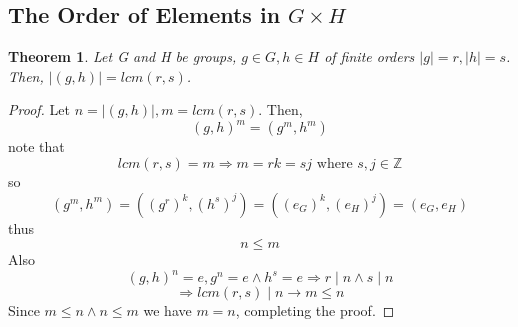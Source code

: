 \documentclass[12pt]{article}
\newtheorem{theorem}{Theorem}
\begin{document}
\subsection*{The Order of Elements in \(G \times H\)}
\begin{theorem}
    Let G and H be groups, \(g \in G, h \in H\) of finite orders \(|g| = r, |h| = s\). 
    Then, \(|(g,h)| = lcm(r,s)\).
\end{theorem}
\begin{proof}
    Let \(n = |(g, h)|, m = lcm(r,s)\). 
    Then, 
    \[ 
        (g,h)^m = (g^m, h^m)
    \]
    note that 
    \[ 
        lcm(r,s) = m \Rightarrow m = rk = sj \text{ where } s,j \in \mathbb Z 
    \]
    so 
    \[ 
        (g^m, h^m) = ((g^r)^k, (h^s)^j) = ((e_G)^k, (e_H)^j) = (e_G, e_H)
    \]
    thus \[n \leq m\] 
    Also 
    \[ 
        (g, h)^n = e, g^n = e \land h^s= e \Rightarrow r \mid n \land s \mid n
    \]
    \[ 
        \Rightarrow lcm(r,s) \mid n \rightarrow m \leq n
    \]
    Since \(m \leq n \land n \leq m\) 
    we have \(m = n\), completing the proof.
    
\end{proof}
\end{document}

